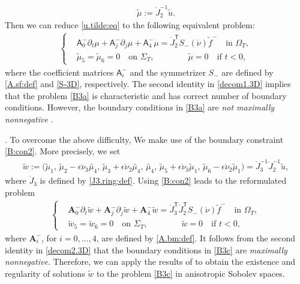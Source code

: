 \documentclass[twoside,11pt]{article}
\numberwithin{equation}{section}
\def\p{\partial}
\begin{document}
\begin{align}	\label{mu.tilde:def}
	\tilde{\mu}:=\mathring{J}_2^{-1}\tilde{u}.
\end{align}
Then we can reduce \eqref{u.tilde:eq} to the following equivalent problem:
\begin{align}\label{B3a}
	\left\{
	\begin{aligned}
		&	{\mathsf{A}}_0^-\p_t   \mu+  {\mathsf{A}}_j^-\p_j   \mu  +{\mathsf{A}}_{4}^- \mu =\mathring{J}_2^{\mathsf{T}}S_{-}(\mathring{\nu})\tilde{f}^-
		\quad \textrm{in }\Omega_T,
		\\[0.5mm]
		&		\tilde\mu_5=\tilde\mu_6=0 \quad
		\textrm{on }\Sigma_T,\qquad\qquad
		\tilde\mu  =0\quad
		\textrm{if } t<0,
	\end{aligned}
	\right.
\end{align}
where the coefficient matrices $\mathsf{A}_i^{-}$ and the symmetrizer $S_-$
are defined by \eqref{A.sf:def} and  \eqref{S-3D}, respectively.
The second identity in \eqref{decom1.3D} implies that
the problem \eqref{B3a} is characteristic and has correct number of boundary conditions.
However, the boundary conditions in \eqref{B3a} are {\it not maximally nonnegative} \cite{R85MR0797053}.

\vspace*{2mm}
.\quad
To overcome the above difficulty, We make use of the boundary constraint \eqref{B:con2}.
More precisely, we set
\begin{align}
	\widetilde{w}:=
	\big( \tilde\mu_1  ,\, \tilde\mu_2-\epsilon \mathring{\nu}_3 \tilde{\mu_4},\,  \tilde\mu_3+\epsilon \mathring{\nu}_2 \tilde{\mu_4},  \,
	\tilde{\mu_4}  ,\,    \tilde\mu_5+\epsilon \mathring{\nu}_3 \tilde\mu_1,  \,\tilde\mu_6-\epsilon \mathring{\nu}_2 \tilde\mu_1
	\big)
	=\mathring{J}_3^{-1} \mathring{J}_2^{-1}\tilde{u},
	\label{w.tilde:def}	
\end{align}
where $\mathring{J}_3$ is defined by \eqref{J3.ring:def}.
Using \eqref{B:con2} leads to the reformulated problem
\begin{align}\label{B3c}
	\left\{
	\begin{aligned}
		& { \bm{A}}_0^-\p_t \widetilde{w}   +{ \bm{A}}_j^-\p_j\widetilde{w}     +{ \bm{A}}_4^-  \widetilde{w} =
		\mathring{J}_3^{\mathsf{T}}\mathring{J}_2^{\mathsf{T}}S_{-}(\mathring{\nu})\tilde{f}^-
		\quad \textrm{in }\Omega_T, \\[1mm]
		&\widetilde{w}_5=\widetilde{w}_6=0 \quad
		\textrm{on }\Sigma_T,\qquad\qquad
		\widetilde{w}  =0\quad
		\textrm{if } t<0,
	\end{aligned}
	\right.
\end{align}
where $	\bm{A}_i^-$, for $i=0,\ldots,4$, are defined by \eqref{A.bm:def}.
It follows from the second identity in \eqref{decom2.3D} that the boundary conditions in \eqref{B3c} are {\it maximally nonnegative}.
Therefore, we can apply the results of \cite{S95MMASMR1346663,S96aMR1401431,OSY95MR1346224} to obtain the existence and regularity of solutions $\widetilde{w} $ to the problem \eqref{B3c} in anisotropic Sobolev spaces.
\end{document}
